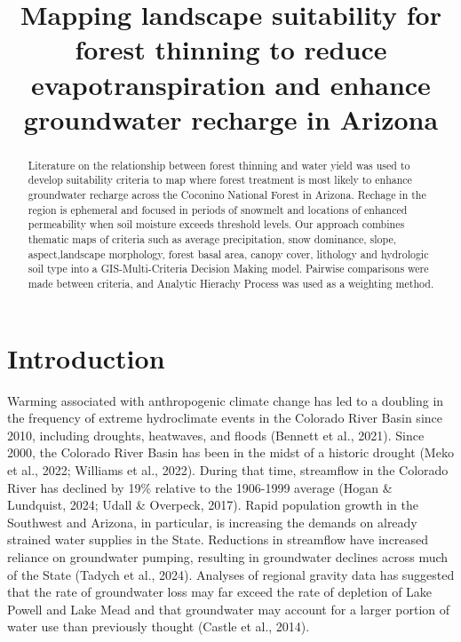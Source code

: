 \documentclass[
]{agujournal2019}
\begin{document}
\title{Mapping landscape suitability for forest thinning to reduce
evapotranspiration and enhance groundwater recharge in Arizona}



\begin{abstract}
Literature on the relationship between forest thinning and water yield
was used to develop suitability criteria to map where forest treatment
is most likely to enhance groundwater recharge across the Coconino
National Forest in Arizona. Rechage in the region is ephemeral and
focused in periods of snowmelt and locations of enhanced permeability
when soil moisture exceeds threshold levels. Our approach combines
thematic maps of criteria such as average precipitation, snow dominance,
slope, aspect,landscape morphology, forest basal area, canopy cover,
lithology and hydrologic soil type into a GIS-Multi-Criteria Decision
Making model. Pairwise comparisons were made between criteria, and
Analytic Hierachy Process was used as a weighting method.
\end{abstract}





\section{Introduction}\label{introduction}

Warming associated with anthropogenic climate change has led to a
doubling in the frequency of extreme hydroclimate events in the Colorado
River Basin since 2010, including droughts, heatwaves, and floods
(Bennett et al., 2021). Since 2000, the Colorado River Basin has been in
the midst of a historic drought (Meko et al., 2022; Williams et al.,
2022). During that time, streamflow in the Colorado River has declined
by 19\% relative to the 1906-1999 average (Hogan \& Lundquist, 2024;
Udall \& Overpeck, 2017). Rapid population growth in the Southwest and
Arizona, in particular, is increasing the demands on already strained
water supplies in the State. Reductions in streamflow have increased
reliance on groundwater pumping, resulting in groundwater declines
across much of the State (Tadych et al., 2024). Analyses of regional
gravity data has suggested that the rate of groundwater loss may far
exceed the rate of depletion of Lake Powell and Lake Mead and that
groundwater may account for a larger portion of water use than
previously thought (Castle et al., 2014).
\end{document}

